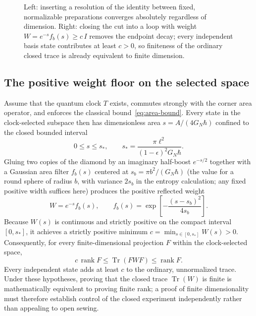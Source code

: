 \documentclass[10pt,a4paper]{article}
\newcommand{\tr}{\operatorname{Tr}}
\newcommand{\rank}{\operatorname{rank}}
\begin{document}
\begin{figure}[htbp]
  \caption{Left: inserting a resolution of the identity between fixed, normalizable preparations converges absolutely regardless of dimension. Right: closing the cut into a loop with weight $W = e^{-s}f_b(s) \ge c\,I$ removes the endpoint decay; every independent basis state contributes at least $c > 0$, so finiteness of the ordinary closed trace is already equivalent to finite dimension.}
  \label{fig:sewing}
\end{figure}

\subsection{The positive weight floor on the selected space}
Assume that the quantum clock $T$ exists, commutes strongly with the corner area operator, and enforces the classical bound~\eqref{eq:area-bound}. Every state in the clock-selected subspace then has dimensionless area $s = A/(4G_N\hbar)$ confined to the closed bounded interval
\[
  0 \le s \le s_*,
  \qquad
  s_* = \frac{\pi\ell^2}{(1-\epsilon)^2 G_N\hbar}.
\]
Gluing two copies of the diamond by an imaginary half-boost $e^{-s/2}$ together with a Gaussian area filter $f_b(s)$ centered at $s_b = \pi b^2/(G_N\hbar)$ (the value for a round sphere of radius $b$, with variance $2s_b$ in the entropy calculation; any fixed positive width suffices here) produces the positive reflected weight
\begin{equation}
  W = e^{-s} f_b(s),
  \qquad
  f_b(s) = \exp\!\left[-\frac{(s - s_b)^2}{4s_b}\right].
  \label{eq:weight}
\end{equation}
Because $W(s)$ is continuous and strictly positive on the compact interval $[0, s_*]$, it achieves a strictly positive minimum $c = \min_{s\in[0,s_*]} W(s) > 0$. Consequently, for every finite-dimensional projection $F$ within the clock-selected space,
\begin{equation}
  c\,\rank F \le \tr(FWF) \le \rank F.
  \label{eq:trace-bounds}
\end{equation}
Every independent state adds at least $c$ to the ordinary, unnormalized trace. Under these hypotheses, proving that the closed trace $\tr(W)$ is finite is mathematically equivalent to proving finite rank; a proof of finite dimensionality must therefore establish control of the closed experiment independently rather than appealing to open sewing.
\end{document}
